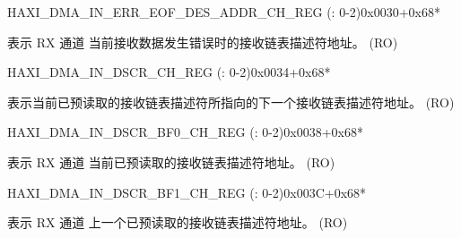 \begin{register}{H}{AXI\_DMA\_IN\_ERR\_EOF\_DES\_ADDR\_CH\_REG (: 0-2)}{0x0030+0x68*}\label{regdesc:AXIDMAINERREOFDESADDRCHNREG}
%
\regnewline%
\begin{regdesc}\begin{reglist}
\label{fielddesc:AXIDMAINERREOFDESADDRCHN}\item [AXI\_DMA\_IN\_ERR\_EOF\_DES\_ADDR\_CH\regindex{n}] 表示 RX 通道  当前接收数据发生错误时的接收链表描述符地址。 (RO)
\end{reglist}\end{regdesc}
\end{register}


\begin{register}{H}{AXI\_DMA\_IN\_DSCR\_CH\_REG (: 0-2)}{0x0034+0x68*}\label{regdesc:AXIDMAINDSCRCHNREG}
%
\regnewline%
\begin{regdesc}\begin{reglist}
\label{fielddesc:AXIDMAINLINKDSCRCHN}\item [AXI\_DMA\_INLINK\_DSCR\_CH\regindex{n}] 表示当前已预读取的接收链表描述符所指向的下一个接收链表描述符地址。 (RO)
\end{reglist}\end{regdesc}
\end{register}


\begin{register}{H}{AXI\_DMA\_IN\_DSCR\_BF0\_CH\_REG (: 0-2)}{0x0038+0x68*}\label{regdesc:AXIDMAINDSCRBF0CHNREG}
%
\regnewline%
\begin{regdesc}\begin{reglist}
\label{fielddesc:AXIDMAINLINKDSCRBF0CHN}\item [AXI\_DMA\_INLINK\_DSCR\_BF0\_CH\regindex{n}] 表示 RX 通道  当前已预读取的接收链表描述符地址。 (RO)
\end{reglist}\end{regdesc}
\end{register}


\begin{register}{H}{AXI\_DMA\_IN\_DSCR\_BF1\_CH\_REG (: 0-2)}{0x003C+0x68*}\label{regdesc:AXIDMAINDSCRBF1CHNREG}
%
\regnewline%
\begin{regdesc}\begin{reglist}
\label{fielddesc:AXIDMAINLINKDSCRBF1CHN}\item [AXI\_DMA\_INLINK\_DSCR\_BF1\_CH\regindex{n}] 表示 RX 通道  上一个已预读取的接收链表描述符地址。 (RO)
\end{reglist}\end{regdesc}
\end{register}


